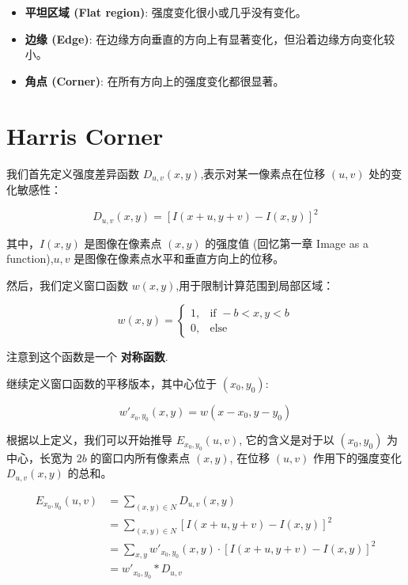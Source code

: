 \begin{itemize}
    \item \textbf{平坦区域 (Flat region)}: 强度变化很小或几乎没有变化。
    \item \textbf{边缘 (Edge)}: 在边缘方向垂直的方向上有显著变化，但沿着边缘方向变化较小。
    \item \textbf{角点 (Corner)}: 在所有方向上的强度变化都很显著。
\end{itemize}

\section{Harris Corner}

我们首先定义强度差异函数 $D_{u,v}(x, y)$,表示对某一像素点在位移 $(u, v)$ 处的变化敏感性：

$$
D_{u,v}(x, y) = \left[I(x + u, y + v) - I(x, y)\right]^2
$$

其中，$I(x, y)$ 是图像在像素点 $(x, y)$ 的强度值 (回忆第一章 Image as a function),$u, v$ 是图像在像素点水平和垂直方向上的位移。

然后，我们定义窗口函数 $w(x, y)$,用于限制计算范围到局部区域：

\begin{equation}
    w(x, y) =
    \begin{cases}
        1, & \text{if } -b < x, y < b \\
        0, & \text{else}
    \end{cases}
\end{equation}

注意到这个函数是一个 \textbf{对称函数}.

继续定义窗口函数的平移版本，其中心位于 $(x_0, y_0)$:

\begin{equation}
    w'_{x_0, y_0}(x, y) = w(x - x_0, y - y_0)
\end{equation}

根据以上定义，我们可以开始推导 $E_{x_0, y_0}(u, v)$, 它的含义是对于以 $(x_0, y_0)$ 为中心，长宽为 $2b$ 的窗口内所有像素点 $(x, y)$, 在位移 $(u, v)$ 作用下的强度变化 $D_{u,v}(x, y)$ 的总和。

\begin{equation}
\begin{aligned}
E_{x_0, y_0}(u, v) &= \sum_{(x, y) \in N} D_{u,v}(x, y) \\
&= \sum_{(x, y) \in N} \left[I(x + u, y + v) - I(x, y)\right]^2 \\
&= \sum_{x, y} w'_{x_0, y_0}(x, y) \cdot \left[I(x + u, y + v) - I(x, y)\right]^2 \\
&= w'_{x_0, y_0} * D_{u,v}
\end{aligned}
\end{equation}

